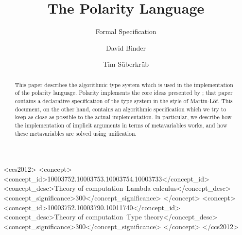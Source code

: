 \documentclass[acmsmall,nonacm]{acmart}
\begin{document}
\title{The Polarity Language}
\subtitle{Formal Specification}



\begin{CCSXML}
  <ccs2012>
  <concept>
  <concept_id>10003752.10003753.10003754.10003733</concept_id>
  <concept_desc>Theory of computation~Lambda calculus</concept_desc>
  <concept_significance>300</concept_significance>
  </concept>
  <concept>
  <concept_id>10003752.10003790.10011740</concept_id>
  <concept_desc>Theory of computation~Type theory</concept_desc>
  <concept_significance>300</concept_significance>
  </concept>
  </ccs2012>
\end{CCSXML}


\author{David Binder}


\author{Tim Süberkrüb}


\begin{abstract}
  This paper describes the algorithmic type system which is used in the implementation of the polarity language.
  Polarity implements the core ideas presented by \citet{Binder2024derivingoop}; that paper contains a declarative specification of the type system in the style of Martin-Löf.
  This document, on the other hand, contains an algorithmic specification which we try to keep as close as possible to the actual implementation.
  In particular, we describe how the implementation of implicit arguments in terms of metavariables works, and how these metavariables are solved using unification.
\end{abstract}

\maketitle
\end{document}
